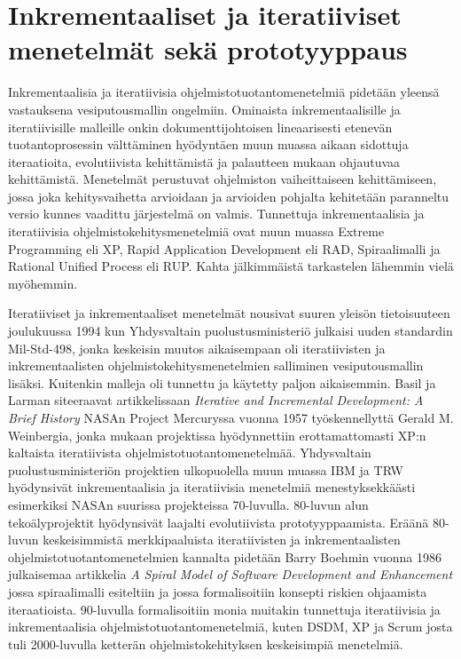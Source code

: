 \documentclass[finnish,12pt]{tktltiki2}
\theoremstyle{definition}
\theoremstyle{remark}
\begin{document}
\section{Inkrementaaliset ja iteratiiviset menetelmät sekä prototyyppaus}

Inkrementaalisia ja iteratiivisia ohjelmistotuotantomenetelmiä pidetään yleensä vastauksena vesiputousmallin ongelmiin. Ominaista inkrementaalisille ja iteratiivisille malleille onkin dokumenttijohtoisen lineaarisesti etenevän tuotantoprosessin välttäminen hyödyntäen muun muassa aikaan sidottuja iteraatioita, evolutiivista kehittämistä ja palautteen mukaan ohjautuvaa kehittämistä. \cite{larman03} Menetelmät perustuvat ohjelmiston vaiheittaiseen kehittämiseen, jossa joka kehitysvaihetta arvioidaan ja arvioiden pohjalta kehitetään paranneltu versio kunnes vaadittu järjestelmä on valmis. \cite{Sommerville10}
Tunnettuja inkrementaalisia ja iteratiivisia ohjelmistokehitysmenetelmiä ovat muun muassa Extreme Programming eli XP, Rapid Application Development eli RAD, Spiraalimalli ja Rational Unified Process eli RUP. Kahta jälkimmäistä tarkastelen lähemmin vielä myöhemmin.

Iteratiiviset ja inkrementaaliset menetelmät nousivat suuren yleisön tietoisuuteen joulukuussa 1994 kun Yhdysvaltain puolustusministeriö julkaisi uuden standardin Mil-Std-498, jonka keskeisin muutos aikaisempaan oli iteratiivisten ja inkrementaalisten ohjelmistokehitysmenetelmien salliminen vesiputousmallin lisäksi. Kuitenkin malleja oli tunnettu ja käytetty paljon aikaisemmin. Basil ja Larman siteeraavat artikkelissaan \textit{Iterative and Incremental Development: A Brief History} NASAn Project Mercuryssa vuonna 1957 työskennellyttä Gerald M. Weinbergia, jonka mukaan projektissa hyödynnettiin erottamattomasti XP:n kaltaista iteratiivista ohjelmistotuotantomenetelmää. Yhdysvaltain puolustusministeriön projektien ulkopuolella muun muassa IBM ja TRW hyödynsivät inkrementaalisia ja iteratiivisia menetelmiä menestyksekkäästi esimerkiksi NASAn suurissa projekteissa 70-luvulla.\cite{larman03} 80-luvun alun tekoälyprojektit hyödynsivät laajalti evolutiivista prototyyppaamista. Eräänä 80-luvun keskeisimmistä merkkipaaluista iteratiivisten ja inkrementaalisten ohjelmistotuotantomenetelmien kannalta pidetään Barry Boehmin vuonna 1986 julkaisemaa artikkelia \textit{A Spiral Model of Software Development and Enhancement} jossa spiraalimalli esiteltiin ja jossa formalisoitiin konsepti riskien ohjaamista iteraatioista. 
90-luvulla formalisoitiin monia muitakin tunnettuja iteratiivisia ja inkrementaalisia ohjelmistotuotantomenetelmiä, kuten DSDM, XP ja Scrum josta tuli 2000-luvulla ketterän ohjelmistokehityksen keskeisimpiä menetelmiä.
\end{document}
